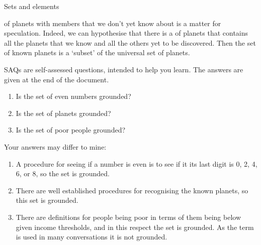 \documentclass[a4paper]{cnx}
\begin{document}
\begin{cnxmodule}[id=m0001,name=Session 1: Set theory in the science of complex systems.]
\begin{ccontent}
\begin{csection}[id=sets-and-elements]{Sets and elements}
\begin{cpara}
    of planets with members that we don't yet know about is a matter for
    speculation. Indeed, we can hypothesise that there is a {} of
    planets that contains all the planets that we know and all the others yet to be
    discovered. Then the set of known planets is a `subset' of the universal set of
    planets.
  \end{cpara}
  \begin{cpara}
    SAQs are self-assessed questions, intended to help you learn. The answers are given at
    the end of the document.\medskip
  \end{cpara}
  \begin{cexercise}[id=saq1,name=SAQ]
    \begin{cproblem}[id=saq1p]
      \begin{enumerate}
      \item Is the set of even numbers grounded?
      \item Is the set of planets grounded?
      \item Is the set of poor people grounded?
      \end{enumerate}
    \end{cproblem}
    \begin{csolution}[id=saq1s]
      Your answers may differ to mine:
      \begin{enumerate}
      \item A procedure for seeing if a number is even is to see if it its last digit is
        0, 2, 4, 6, or 8, so the set is grounded. 
      \item There are well established procedures for recognising the known planets, so
        this set is grounded.
      \item There are definitions for people being poor in terms of them being below given
        income thresholds, and in this respect the set is grounded. As the term is used in
        many conversations it is not grounded.
      \end{enumerate}
    \end{csolution}
  \end{cexercise}
\end{csection}


\end{ccontent}
\end{cnxmodule}
\end{document}
